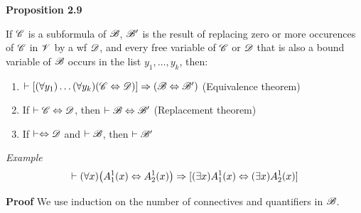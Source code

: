 \textbf{Proposition 2.9}

If $\mathscr{C}$ is a subformula of $\mathscr{B}$, $\mathscr{B}'$ is the result of replacing zero or more occurences of $\mathscr{C}$ in $\mathscr{V}$ by a wf $\mathscr{D}$, and every free variable of $\mathscr{C}$ or $\mathscr{D}$ that is also a bound variable of $\mathscr{B}$ occurs in the list $y_1,\dots, y_k$, then:

\begin{enumerate} [label = \alph*.]
    \item $\vdash [(\forall y_1) \dots(\forall y_k)(\mathscr{C} \Leftrightarrow \mathscr{D})] \Rightarrow (\mathscr{B} \Leftrightarrow \mathscr{B}')$ (Equivalence theorem)
    \item If $\vdash \mathscr{C} \Leftrightarrow \mathscr{D}$, then $\vdash \mathscr{B} \Leftrightarrow \mathscr{B}'$ (Replacement theorem)
    \item If $\vdash \Leftrightarrow \mathscr{D}$ and  $\vdash \mathscr{B}$, then $\vdash \mathscr{B}'$
\end{enumerate}

\textit{Example}
\[\vdash (\forall x) \big(A_1^1(x) \Leftrightarrow A_2^1(x)\big ) \Rightarrow [(\exists x) A_1^1(x) \Leftrightarrow (\exists x) A_2^1(x)]\]

\textbf{Proof} 
We use induction on the number of connectives and quantifiers in $\mathscr{B}$.

